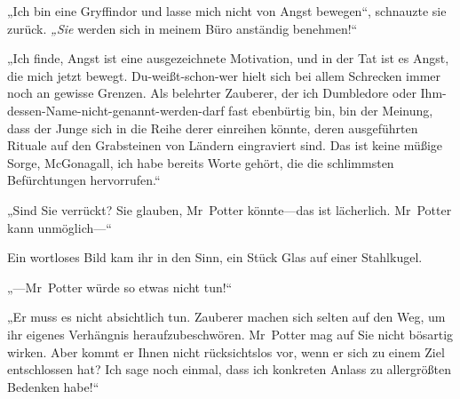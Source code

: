„Ich bin eine Gryffindor und lasse mich nicht von Angst bewegen“, schnauzte sie zurück. \emph{„Sie} werden sich in meinem Büro anständig benehmen!“

„Ich finde, Angst ist eine ausgezeichnete Motivation, und in der Tat ist es Angst, die mich jetzt bewegt. Du-weißt-schon-wer hielt sich bei allem Schrecken immer noch an gewisse Grenzen. Als belehrter Zauberer, der ich Dumbledore oder Ihm-dessen-Name-nicht-genannt-werden-darf fast ebenbürtig bin, bin der Meinung, dass der Junge sich in die Reihe derer einreihen könnte, deren ausgeführten Rituale auf den Grabsteinen von Ländern eingraviert sind. Das ist keine müßige Sorge, McGonagall, ich habe bereits Worte gehört, die die schlimmsten Befürchtungen hervorrufen.“

„Sind Sie verrückt? Sie glauben, Mr~Potter könnte—das ist lächerlich. Mr~Potter kann unmöglich—“

Ein wortloses Bild kam ihr in den Sinn, ein Stück Glas auf einer Stahlkugel.

„—Mr~Potter würde so etwas nicht tun!“

„Er muss es nicht absichtlich tun. Zauberer machen sich selten auf den Weg, um ihr eigenes Verhängnis heraufzubeschwören. Mr~Potter mag auf Sie nicht bösartig wirken. Aber kommt er Ihnen nicht rücksichtslos vor, wenn er sich zu einem Ziel entschlossen hat? Ich sage noch einmal, dass ich konkreten Anlass zu allergrößten Bedenken habe!“

